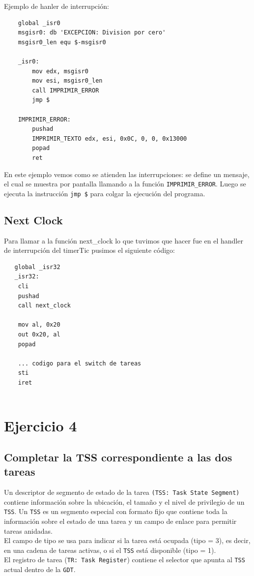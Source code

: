 \documentclass[a4paper, 10pt]{article}
\begin{document}
\vspace{1cm}
Ejemplo de hanler de interrupci\'on:

\lstset{language=[x86masm]Assembler}
\begin{lstlisting}
	global _isr0
	msgisr0: db 'EXCEPCION: Division por cero'
	msgisr0_len equ $-msgisr0
	
	_isr0:
		mov edx, msgisr0
		mov esi, msgisr0_len
		call IMPRIMIR_ERROR
		jmp $	
	
	IMPRIMIR_ERROR:
		pushad
		IMPRIMIR_TEXTO edx, esi, 0x0C, 0, 0, 0x13000
		popad
		ret
\end{lstlisting}
\vspace{1cm}

En este ejemplo vemos como se atienden las interrupciones: se define un mensaje, el cual se muestra por pantalla llamando a la funci\'on \texttt{IMPRIMIR\_ERROR}. Luego se ejecuta la instrucci\'on \texttt{jmp \$} para colgar la ejecuci\'on del programa.

\subsection{Next Clock}

Para llamar a la funci\'on next\_clock lo que tuvimos que hacer fue en el handler de interrupci\'on del timerTic pusimos el siguiente c\'odigo:

\lstset{language=[x86masm]Assembler}
\begin{lstlisting}
   global _isr32
   _isr32:
	cli
	pushad
	call next_clock

	mov al, 0x20
	out 0x20, al
	popad

	...	codigo para el switch de tareas 
	sti
	iret
  
\end{lstlisting}
\vspace{1cm}

\newpage

\section{Ejercicio 4}
\subsection{Completar la TSS correspondiente a las dos tareas}
Un descriptor de segmento de estado de la tarea \texttt{(TSS: Task State Segment)} contiene informaci\'on sobre la ubicaci\'on, el tama\~no y el nivel de privilegio de un \texttt{TSS}. Un \texttt{TSS} es un segmento especial con formato fijo que contiene toda la informaci\'on sobre el estado de una tarea y un campo de enlace para permitir tareas anidadas. \\
El campo de tipo se usa para indicar si la tarea est\'a ocupada (tipo = 3), es decir, en una cadena de tareas activas, o si el \texttt{TSS} est\'a disponible (tipo = 1). \\
El registro de tarea (\texttt{TR: Task Register}) contiene el selector que apunta al \texttt{TSS} actual dentro de la \texttt{GDT}. \\ 
\end{document}
